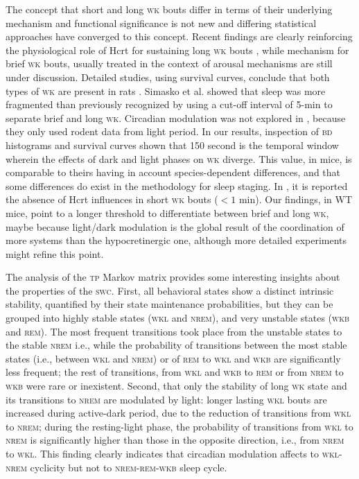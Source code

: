 \documentclass[10pt,letterpaper]{article}
\def\REM/{\textsc{rem}}
\def\NREM/{\textsc{nrem}}
\def\WK/{\textsc{wk}}
\def\WKL/{\textsc{wkl}}
\def\WKB/{\textsc{wkb}}
\def\SWC/{\textsc{swc}}
\def\BD/{\textsc{bd}}
\def\TP/{\textsc{tp}}
\begin{document}
The concept that short and long \WK/ bouts differ in terms of their underlying mechanism and functional significance is not new \cite{Lo2004,stephenson2013statistical,McShane2010,Simasko2009,Behn2007} and differing statistical approaches have converged to this concept. Recent findings are clearly reinforcing the physiological role of Hcrt for sustaining long \WK/ bouts \cite{behn2008delayed,branch2016progressive}, while mechanism for brief \WK/ bouts, usually treated in the context of arousal mechanisms are still under discussion. Detailed studies, using survival curves,  conclude that both types of \WK/ are present in rats \cite{stephenson2013statistical,Simasko2009}. Simasko et al. showed that sleep was more fragmented than previously recognized by using a cut-off interval of 5-min to separate brief and long \WK/. Circadian modulation was not explored in \cite{Lo2004}, because they only used rodent data from light period.  In our results, inspection of \BD/ histograms and survival curves shown that 150 second is the temporal window wherein the effects of dark and light phases on \WK/ diverge. This value,  in mice, is comparable to theirs having in account species-dependent differences, and that some differences do exist in the  methodology for sleep staging.  In  \cite{behn2008delayed}, it is reported  the absence of Hcrt influences in short \WK/ bouts ($<1$ min). Our findings, in WT mice,  point to a longer threshold  to differentiate between  brief and long \WK/,   maybe because light/dark modulation is the global result of the coordination of more systems than the hypocretinergic one, although more detailed experiments might refine this point. 


The analysis of the \TP/ Markov matrix provides some interesting insights about the properties of the \SWC/. First, all behavioral states show a distinct intrinsic stability, quantified by their state maintenance probabilities,   but they can be grouped into highly stable states (\WKL/ and \NREM/), and very unstable states (\WKB/ and \REM/). The most frequent transitions took place from the unstable states  to the stable \NREM/ i.e., while the probability of transitions between the most stable states (i.e., between \WKL/ and \NREM/) or of \REM/ to \WKL/ and \WKB/ are significantly less frequent; the rest of transitions, from \WKL/ and \WKB/ to \REM/ or from \NREM/ to \WKB/ were rare or inexistent. Second, that only the stability of long \WK/ state and its transitions to \NREM/ are modulated by light: longer lasting \WKL/ bouts are increased  during active-dark period, due to the reduction of transitions from \WKL/ to \NREM/; during the resting-light phase, the probability of transitions from \WKL/ to \NREM/ is significantly higher than those in the opposite direction, i.e., from \NREM/ to \WKL/. This finding clearly indicates  that circadian modulation affects to \WKL/-\NREM/ cyclicity but not to \NREM/-\REM/-\WKB/ sleep cycle. 
\end{document}
